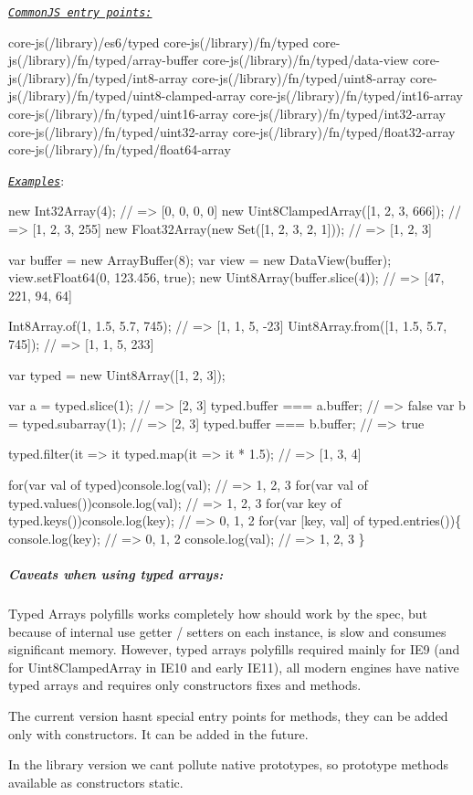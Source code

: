  \href{#commonjs}{\tt {\itshape Common\+JS entry points\+:}} 
\begin{DoxyCode}
core-js(/library)/es6/typed
core-js(/library)/fn/typed
core-js(/library)/fn/typed/array-buffer
core-js(/library)/fn/typed/data-view
core-js(/library)/fn/typed/int8-array
core-js(/library)/fn/typed/uint8-array
core-js(/library)/fn/typed/uint8-clamped-array
core-js(/library)/fn/typed/int16-array
core-js(/library)/fn/typed/uint16-array
core-js(/library)/fn/typed/int32-array
core-js(/library)/fn/typed/uint32-array
core-js(/library)/fn/typed/float32-array
core-js(/library)/fn/typed/float64-array
\end{DoxyCode}
 \href{http://goo.gl/yla75z}{\tt {\itshape Examples}}\+: 
\begin{DoxyCode}
new Int32Array(4);                          // => [0, 0, 0, 0]
new Uint8ClampedArray([1, 2, 3, 666]);      // => [1, 2, 3, 255]
new Float32Array(new Set([1, 2, 3, 2, 1])); // => [1, 2, 3]

var buffer = new ArrayBuffer(8);
var view   = new DataView(buffer);
view.setFloat64(0, 123.456, true);
new Uint8Array(buffer.slice(4)); // => [47, 221, 94, 64]

Int8Array.of(1, 1.5, 5.7, 745);      // => [1, 1, 5, -23]
Uint8Array.from([1, 1.5, 5.7, 745]); // => [1, 1, 5, 233]

var typed = new Uint8Array([1, 2, 3]);

var a = typed.slice(1);    // => [2, 3]
typed.buffer === a.buffer; // => false
var b = typed.subarray(1); // => [2, 3]
typed.buffer === b.buffer; // => true

typed.filter(it => it %
typed.map(it => it * 1.5);  // => [1, 3, 4]

for(var val of typed)console.log(val);          // => 1, 2, 3
for(var val of typed.values())console.log(val); // => 1, 2, 3
for(var key of typed.keys())console.log(key);   // => 0, 1, 2
for(var [key, val] of typed.entries())\{
  console.log(key);                             // => 0, 1, 2
  console.log(val);                             // => 1, 2, 3
\}
\end{DoxyCode}
 \subparagraph*{Caveats when using typed arrays\+:}


\begin{DoxyItemize}
\item Typed Arrays polyfills works completely how should work by the spec, but because of internal use getter / setters on each instance, is slow and consumes significant memory. However, typed arrays polyfills required mainly for I\+E9 (and for {\ttfamily Uint8\+Clamped\+Array} in I\+E10 and early I\+E11), all modern engines have native typed arrays and requires only constructors fixes and methods.
\item The current version hasn\textquotesingle{}t special entry points for methods, they can be added only with constructors. It can be added in the future.
\item In the {\ttfamily library} version we can\textquotesingle{}t pollute native prototypes, so prototype methods available as constructors static.
\end{DoxyItemize}

